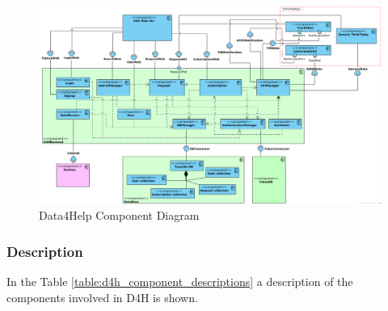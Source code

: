 \documentclass[a4paper, hidelinks, 12pt]{report}
\begin{document}
			\begin{figure}
    				\centering
				\includegraphics[width=1\textwidth]{diagrams/d4h_component_diagram.png}
				\caption[Data4Help Component Diagram]{Data4Help Component Diagram}
				\label{fig:d4h_component_diagram}
			\end{figure}	
			\clearpage
			\subsubsection{Description}
			In the Table \ref{table:d4h_component_descriptions} a description of the components involved in D4H is shown.
			
\end{document}

